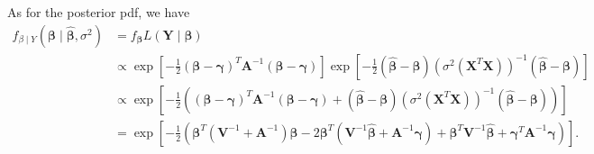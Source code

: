 \begin{enumerate}[a)]
As for the posterior pdf, we have 
\begin{align*}
    f_{\beta \mid Y}(\bm{\beta} \mid \hat{\bm{\beta}}, \sigma^2) &= f_{\bm{\beta}} L(\bm{Y} \mid \bm{\beta}) \\
    & \propto \exp \left[ -\frac{1}{2} (\bm{\beta} - \bm{\gamma})^T \bm{A}^{-1} (\bm{\beta} - \bm{\gamma}) \right] \exp \left[ -\frac{1}{2} (\hat{\bm{\beta}} - \bm{\beta})\left(\sigma^2(\bm{X}^T\bm{X})\right)^{-1}(\hat{\bm{\beta}} - \bm{\beta}) \right] \\
    & \propto \exp \left[ -\frac{1}{2} \left((\bm{\beta} - \bm{\gamma})^T \bm{A}^{-1} (\bm{\beta} - \bm{\gamma}) + (\hat{\bm{\beta}} - \bm{\beta})\left(\sigma^2(\bm{X}^T\bm{X})\right)^{-1}(\hat{\bm{\beta}} - \bm{\beta}) \right)\right] \\
    &= \exp \left[ -\frac{1}{2} \left(\bm{\beta}^T(\bm{V}^{-1} + \bm{A}^{-1})\bm{\beta} - 2\bm{\beta}^T (\bm{V}^{-1} \hat{\bm{\beta}} + \bm{A}^{-1} \bm{\gamma}) + \bm{\beta}^T \bm{V}^{-1} \hat{\bm{\beta}} + \bm{\gamma}^T \bm{A}^{-1}\bm{\gamma} \right) \right].
\end{align*}

\end{enumerate}
